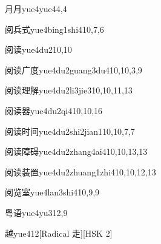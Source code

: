 \begin{entry}{月月}{yue4yue4}{4,4}
\end{entry}

\begin{entry}{阅兵式}{yue4bing1shi4}{10,7,6}
\end{entry}

\begin{entry}{阅读}{yue4du2}{10,10}
\end{entry}

\begin{entry}{阅读广度}{yue4du2guang3du4}{10,10,3,9}
\end{entry}

\begin{entry}{阅读理解}{yue4du2li3jie3}{10,10,11,13}
\end{entry}

\begin{entry}{阅读器}{yue4du2qi4}{10,10,16}
\end{entry}

\begin{entry}{阅读时间}{yue4du2shi2jian1}{10,10,7,7}
\end{entry}

\begin{entry}{阅读障碍}{yue4du2zhang4ai4}{10,10,13,13}
\end{entry}

\begin{entry}{阅读装置}{yue4du2zhuang1zhi4}{10,10,12,13}
\end{entry}

\begin{entry}{阅览室}{yue4lan3shi4}{10,9,9}
\end{entry}

\begin{entry}{粤语}{yue4yu3}{12,9}
\end{entry}

\begin{entry}{越}{yue4}{12}[Radical 走][HSK 2]
\end{entry}


